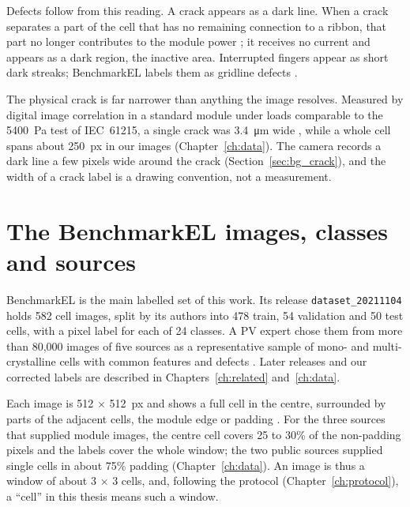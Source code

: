 Defects follow from this reading. A crack appears as a dark line. When a crack separates a part of the cell that has no
remaining connection to a ribbon, that part no longer contributes to the module power \citep{haase2018crackwidth}; it
receives no current and appears as a dark region, the inactive area. Interrupted fingers appear as short dark
streaks; BenchmarkEL labels them as gridline defects \citep{pratt2023benchmark}.

The physical crack is far narrower than anything the image resolves. Measured by digital image correlation in a standard
module under loads comparable to the \SI{5400}{\pascal} test of IEC~61215, a single crack was \SI{3.4}{\micro\metre} wide
\citep{haase2018crackwidth}, while a whole cell spans about 250~px in our images (Chapter~\ref{ch:data}). The camera records
a dark line a few pixels wide around the crack (Section~\ref{sec:bg_crack}), and the width of a crack label is a drawing
convention, not a measurement.

\section{The BenchmarkEL images, classes and sources}\label{sec:bg_classes}

BenchmarkEL \citep{pratt2023benchmark} is the main labelled set of this work. Its release \texttt{dataset\_20211104} holds
582 cell images, split by its authors into 478 train, 54 validation and 50 test cells, with a pixel label for each of
24 classes. A PV expert chose them from more than 80,000 images of five sources as a representative sample of mono- and
multi-crystalline cells with common features and defects \citep{pratt2023benchmark}. Later releases and our corrected labels
are described in Chapters~\ref{ch:related} and~\ref{ch:data}.

Each image is 512 $\times$ 512~px and shows a full cell in the centre, surrounded by parts of the adjacent cells, the
module edge or padding \citep{pratt2023benchmark}. For the three sources that supplied module images, the centre cell covers
25 to 30\% of the non-padding pixels and the labels cover the whole window; the two public sources supplied single cells in
about 75\% padding (Chapter~\ref{ch:data}). An image is thus a window of about 3 $\times$ 3 cells, and, following the
protocol (Chapter~\ref{ch:protocol}), a ``cell'' in this thesis means such a window.

